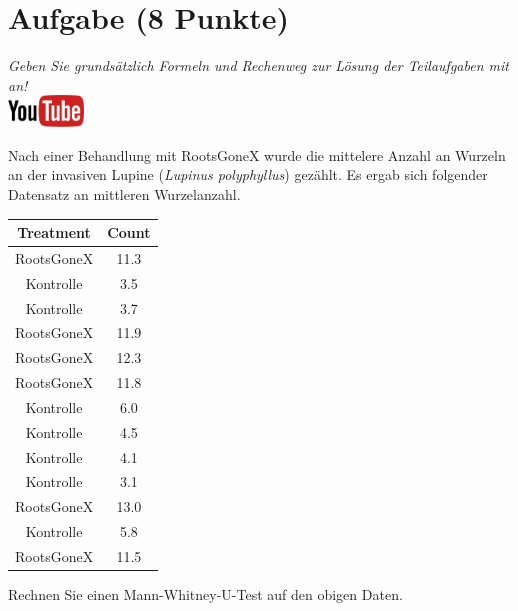 \documentclass[a4paper, 9pt]{scrartcl}\usepackage[]{graphicx}\usepackage[]{xcolor}
\newenvironment{knitrout}{}{} %
\begin{document}
\section{Aufgabe \hfill (8 Punkte)}

\textit{Geben Sie grunds{\"a}tzlich Formeln und Rechenweg zur L{\"o}sung der
  Teilaufgaben mit an!} \\[1Ex]

\hfill\href{https://youtu.be/5tiJFxuZcco}{\includegraphics[width =
  2cm]{img/youtube}} %
\hspace{2Ex}




Nach einer Behandlung mit RootsGoneX wurde die mittelere Anzahl an Wurzeln
an der invasiven Lupine (\textit{Lupinus polyphyllus}) gez{\"a}hlt. Es ergab sich
folgender Datensatz an mittleren Wurzelanzahl.

\begin{knitrout}
\color{fgcolor}\begin{table}[!h]
\centering
\begin{tabular}{cc}
\toprule
Treatment & Count\\
\midrule
RootsGoneX & 11.3\\
Kontrolle & 3.5\\
Kontrolle & 3.7\\
RootsGoneX & 11.9\\
RootsGoneX & 12.3\\
\addlinespace
RootsGoneX & 11.8\\
Kontrolle & 6.0\\
Kontrolle & 4.5\\
Kontrolle & 4.1\\
Kontrolle & 3.1\\
\addlinespace
RootsGoneX & 13.0\\
Kontrolle & 5.8\\
RootsGoneX & 11.5\\
\bottomrule
\end{tabular}
\end{table}

\end{knitrout}

Rechnen Sie einen Mann-Whitney-U-Test auf den obigen Daten.
\end{document}
